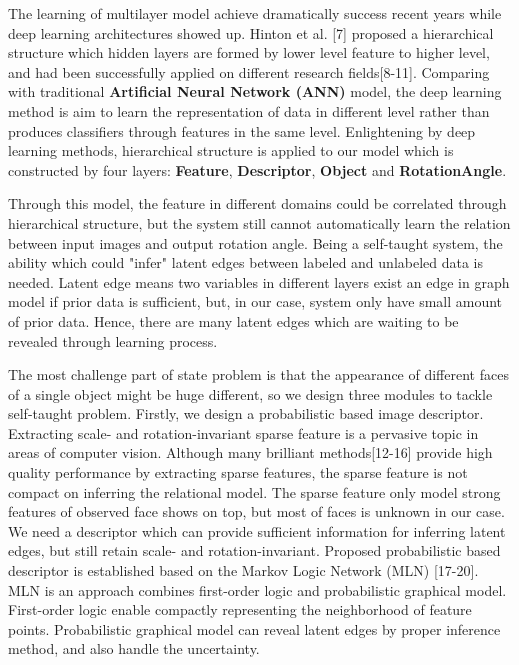 \documentclass[journal]{IEEEtran}
\begin{document}
The learning of multilayer model achieve dramatically success recent years while deep learning architectures showed up. Hinton et al. [7] proposed a hierarchical structure which hidden layers are formed by lower level feature to higher level, and had been successfully applied on different research fields[8-11]. Comparing with traditional \textbf{Artificial Neural Network (ANN)} model, the deep learning method is aim to learn the representation of data in different level rather than produces classifiers through features in the same level. Enlightening by deep learning methods, hierarchical structure is applied to our model which is constructed by four layers: \textbf{Feature}, \textbf{Descriptor}, \textbf{Object} and \textbf{RotationAngle}.

Through this model, the feature in different domains could be correlated through hierarchical structure, but the system still cannot automatically learn the relation between input images and output rotation angle. Being a self-taught system, the ability which could "infer" latent edges between labeled and unlabeled data is needed. Latent edge means two variables in different layers exist an edge in graph model if prior data is sufficient, but, in our case, system only have small amount of prior data. Hence, there are many latent edges which are waiting to be revealed through learning process. 

The most challenge part of state problem is that the appearance of different faces of a single object might be huge different, so we design three modules to tackle self-taught problem. Firstly, we design a probabilistic based image descriptor. Extracting scale- and rotation-invariant sparse feature is a pervasive topic in areas of computer vision. Although many brilliant methods[12-16] provide high quality performance by extracting sparse features, the sparse feature is not compact on inferring the relational model. The sparse feature only model strong features of observed face shows on top, but most of faces is unknown in our case. We need a descriptor which can provide sufficient information for inferring latent edges, but still retain scale- and rotation-invariant. Proposed probabilistic based descriptor is established based on the Markov Logic Network (MLN) [17-20]. MLN is an approach combines first-order logic and probabilistic graphical model. First-order logic enable compactly representing the neighborhood of feature points. Probabilistic graphical model can reveal latent edges by proper inference method, and also handle the uncertainty. 
\end{document}
